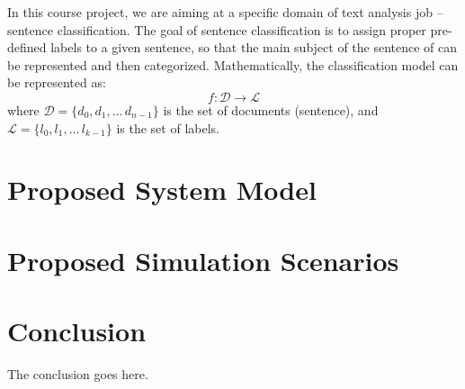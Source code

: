 \documentclass[conference]{IEEEtran}
\begin{document}
    In this course project, we are aiming at a specific domain of text analysis
    job -- sentence classification. The goal of sentence classification is to assign
    proper pre-defined labels to a given sentence, so that the main subject of the 
    sentence of can be represented and then categorized\cite{allahyari2017brief}. 
    Mathematically, the classification model can be represented as:
    $$f:\mathcal{D}\rightarrow\mathcal{L}$$
    where $\mathcal{D}=\{d_0, d_1,\ldots\, d_{n-1}\}$ is the set of documents 
    (sentence), and $\mathcal{L}=\{l_0, l_1,\ldots\, l_{k-1}\}$ is the set of labels.

\section{Proposed System Model}

\section{Proposed Simulation Scenarios}

\section{Conclusion}
The conclusion goes here.



\end{document}
